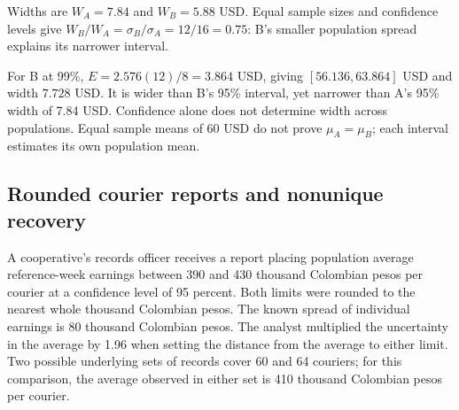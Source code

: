 Widths are $W_A=7.84$ and $W_B=5.88$ USD. Equal sample sizes and confidence levels give $W_B/W_A=\sigma_B/\sigma_A=12/16=0.75$: B's smaller population spread explains its narrower interval.

For B at 99\%, $E=2.576(12)/8=3.864$ USD, giving $[56.136,63.864]$ USD and width $7.728$ USD. It is wider than B's 95\% interval, yet narrower than A's 95\% width of 7.84 USD. Confidence alone does not determine width across populations. Equal sample means of 60 USD do not prove $\mu_A=\mu_B$; each interval estimates its own population mean.

\clearpage
\subsection{Rounded courier reports and nonunique recovery}\label{prob:c4-advanced-2}
A cooperative's records officer receives a report placing population average reference-week earnings between 390 and 430 thousand Colombian pesos per courier at a confidence level of 95 percent. Both limits were rounded to the nearest whole thousand Colombian pesos. The known spread of individual earnings is 80 thousand Colombian pesos. The analyst multiplied the uncertainty in the average by 1.96 when setting the distance from the average to either limit. Two possible underlying sets of records cover 60 and 64 couriers; for this comparison, the average observed in either set is 410 thousand Colombian pesos per courier.

\clearpage
